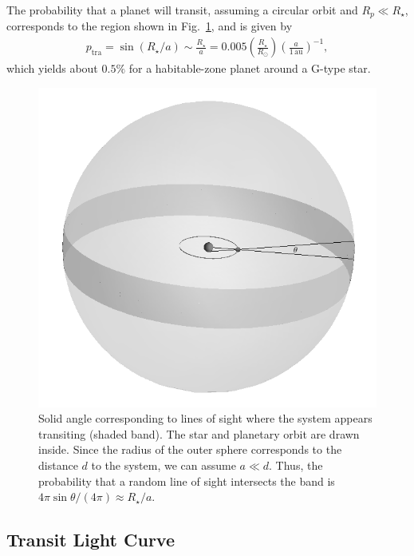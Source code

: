The probability that a planet will transit, assuming a circular orbit and $R_p \ll R_\star$, corresponds to the region shown in Fig.~\ref{fig:transitprob}, and is given by
\begin{align}
p_\mathrm{tra} = \sin{(R_\star/a)} \sim \frac{R_\star}{a} = 0.005 \left(\frac{R_\star}{R_\odot}\right) \left(\frac{a}{1 \mathrm{\, au}}\right)^{-1},
\label{eq:tranp}
\end{align}
which yields about $0.5\%$ for a habitable-zone planet around a G-type star.  

\begin{figure}[!hbt]
\begin{center}
	\includegraphics[width=\linewidth]{fig/transit_prob_bw.png}
\end{center}
\caption{Solid angle corresponding to lines of sight where the system appears transiting (shaded band). The star and planetary orbit are drawn inside. Since the radius of the outer sphere corresponds to the distance $d$ to the system, we can assume $a \ll d$. Thus, the probability that a random line of sight intersects the band is $4 \pi \sin{\theta}/ (4 \pi) \approx R_\star/a$.\label{fig:transitprob}}
\end{figure}

\subsection*{Transit Light Curve}

